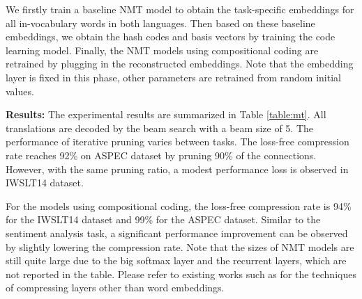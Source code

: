 \documentclass{article} \usepackage{iclr2018_conference_review,times}
\begin{document}
We firstly train a baseline NMT model to obtain the task-specific embeddings for all in-vocabulary words in both languages. Then based on these baseline embeddings, we obtain the hash codes and basis vectors by training the code learning model. Finally, the NMT models using compositional coding are retrained by plugging in the reconstructed embeddings. Note that the embedding layer is fixed in this phase, other parameters are retrained from random initial values.

{\bf Results:} \: The experimental results are summarized in Table \ref{table:mt}. All translations are decoded by the beam search with a beam size of 5. The performance of iterative pruning varies between tasks. The loss-free compression rate reaches 92\% on ASPEC dataset by pruning 90\% of the connections. However, with the same pruning ratio, a modest performance loss is observed in IWSLT14 dataset.



For the models using compositional coding, the loss-free compression rate is 94\% for the IWSLT14 dataset and 99\% for the ASPEC dataset. Similar to the sentiment analysis task, a significant performance improvement can be observed by slightly lowering the compression rate. Note that the sizes of NMT models are still quite large due to the big softmax layer and the recurrent layers, which are not reported in the table. Please refer to existing works such as \citet{Zhang2017TowardsCA} for the techniques of compressing layers other than word embeddings. 
\end{document}
